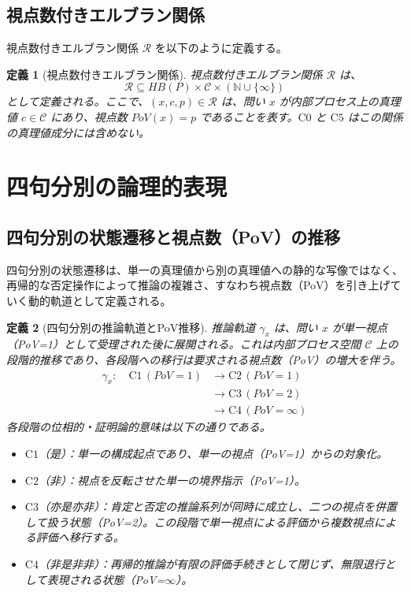 \documentclass[11pt,a4paper]{article}
\newtheorem{definition}{定義}
\newcommand{\HB}{\mathit{HB}}
\newcommand{\PoV}{\mathit{PoV}}
\newcommand{\C}{\mathcal{C}}
\newcommand{\Czero}{\text{C0}}
\newcommand{\Cone}{\text{C1}}
\newcommand{\Ctwo}{\text{C2}}
\newcommand{\Cthree}{\text{C3}}
\newcommand{\Cfour}{\text{C4}}
\newcommand{\Cfive}{\text{C5}}
\newcommand{\R}{\mathcal{R}}
\begin{document}
\subsection{視点数付きエルブラン関係}
\label{subsec:pov-herbrand-rel}

視点数付きエルブラン関係 $\R$ を以下のように定義する。

\begin{definition}[視点数付きエルブラン関係]
視点数付きエルブラン関係 $\R$ は、
\[
\R \subseteq \HB(P) \times \C \times (\mathbb{N} \cup \{\infty\})
\]
として定義される。ここで、$(x, c, p) \in \R$ は、問い $x$ が内部プロセス上の真理値 $c \in \C$ にあり、視点数 $\PoV(x) = p$ であることを表す。$\Czero$ と $\Cfive$ はこの関係の真理値成分には含めない。
\end{definition}

\section{四句分別の論理的表現}
\label{sec:fourfold}



\subsection{四句分別の状態遷移と視点数（PoV）の推移}
\label{subsec:fourfold-trans}

四句分別の状態遷移は、単一の真理値から別の真理値への静的な写像ではなく、再帰的な否定操作によって推論の複雑さ、すなわち視点数（PoV）を引き上げていく動的軌道として定義される。

\begin{definition}[四句分別の推論軌道とPoV推移]
推論軌道 $\gamma_x$ は、問い $x$ が単一視点（PoV=1）として受理された後に展開される。これは内部プロセス空間 $\C$ 上の段階的推移であり、各段階への移行は要求される視点数（PoV）の増大を伴う。
\begin{align*}
\gamma_x :\quad
\Cone\, (\PoV=1)
&\longrightarrow \Ctwo\, (\PoV=1) \\
&\longrightarrow \Cthree\, (\PoV=2) \\
&\longrightarrow \Cfour\, (\PoV=\infty)
\end{align*}
各段階の位相的・証明論的意味は以下の通りである。
\begin{itemize}
\item $\Cone$（是）：単一の構成起点であり、単一の視点（PoV=1）からの対象化。
\item $\Ctwo$（非）：視点を反転させた単一の境界指示（PoV=1）。
\item $\Cthree$（亦是亦非）：肯定と否定の推論系列が同時に成立し、二つの視点を併置して扱う状態（PoV=2）。この段階で単一視点による評価から複数視点による評価へ移行する。
\item $\Cfour$（非是非非）：再帰的推論が有限の評価手続きとして閉じず、無限退行として表現される状態（PoV=$\infty$）。
\end{itemize}
\end{definition}
\end{document}
